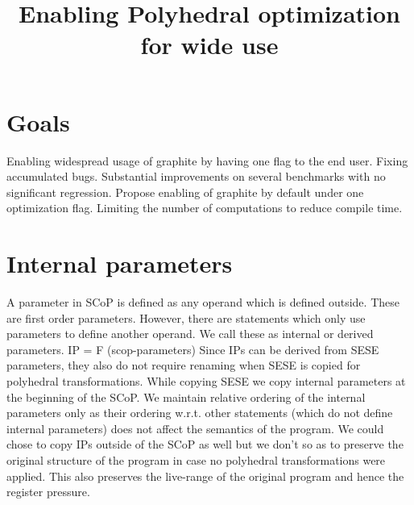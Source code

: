 \title{Enabling Polyhedral optimization for wide use}


\section{Goals}
Enabling widespread usage of graphite by having one flag to the end user.
Fixing accumulated bugs.
Substantial improvements on several benchmarks with no significant regression.
Propose enabling of graphite by default under one optimization flag.
Limiting the number of computations to reduce compile time.

\section{Internal parameters}
A parameter in SCoP is defined as any operand which is defined outside. These are first order parameters.
However, there are statements which only use parameters to define another operand. We call these as internal or
derived parameters.
IP = F (scop-parameters)
Since IPs can be derived from SESE parameters, they also do not require renaming when SESE is copied for polyhedral
transformations. While copying SESE we copy internal parameters at the beginning of the SCoP.
We maintain relative ordering of the internal parameters only as their ordering w.r.t. other
statements (which do not define internal parameters) does not affect the semantics of the program.
We could chose to copy IPs outside of the SCoP as well but we don't so as to preserve the original structure of the
program in case no polyhedral transformations were applied. This also preserves the live-range
of the original program and hence the register pressure.


